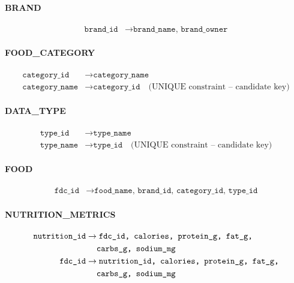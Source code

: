 \documentclass[12pt,a4paper]{article}
\begin{document}
\begin{fdbox}
\paragraph{BRAND}
\begin{align}
\texttt{brand\_id} &\to \texttt{brand\_name, brand\_owner} \label{fd:b1}
\end{align}

\paragraph{FOOD\_CATEGORY}
\begin{align}
\texttt{category\_id} &\to \texttt{category\_name} \\
\texttt{category\_name} &\to \texttt{category\_id} \quad \text{(UNIQUE constraint -- candidate key)}
\end{align}

\paragraph{DATA\_TYPE}
\begin{align}
\texttt{type\_id} &\to \texttt{type\_name} \\
\texttt{type\_name} &\to \texttt{type\_id} \quad \text{(UNIQUE constraint -- candidate key)}
\end{align}

\paragraph{FOOD}
\begin{align}
\texttt{fdc\_id} &\to \texttt{food\_name, brand\_id, category\_id, type\_id}
\end{align}

\paragraph{NUTRITION\_METRICS}
\begin{align}
\texttt{nutrition\_id} &\to \texttt{fdc\_id, calories, protein\_g, fat\_g,} \notag \\
                       &\quad\; \texttt{carbs\_g, sodium\_mg} \\
\texttt{fdc\_id} &\to \texttt{nutrition\_id, calories, protein\_g, fat\_g,} \notag \\
                 &\quad\; \texttt{carbs\_g, sodium\_mg}
\end{align}


\end{fdbox}
\end{document}
